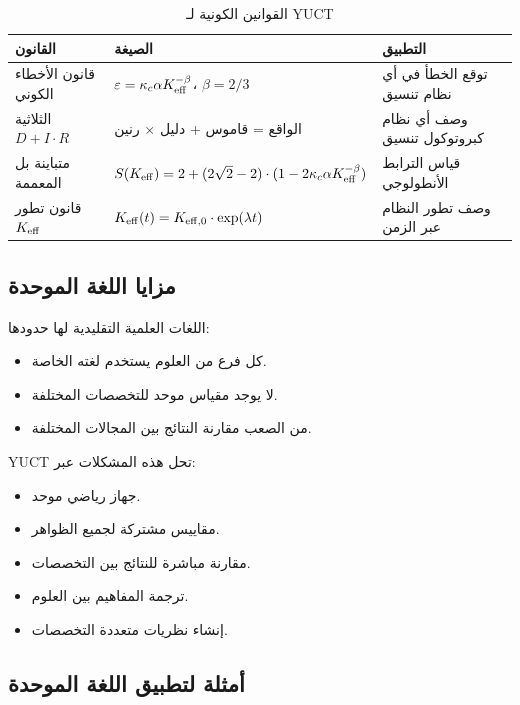 \documentclass[11pt,a4paper]{article}
\begin{document}
	\begin{table}[H]
		\centering
		\caption{القوانين الكونية لـ YUCT}
		\label{tab:universal-laws}
		\begin{tabular}{p{5cm}p{6cm}p{5cm}}
			\toprule
			\textbf{القانون} & \textbf{الصيغة} & \textbf{التطبيق} \\
			\midrule
			قانون الأخطاء الكوني & \(\varepsilon = \kappa_c \alpha \Keff^{-\beta}\)، \(\beta = 2/3\) & توقع الخطأ في أي نظام تنسيق \\
			الثلاثية \(D + I \cdot R\) & الواقع = قاموس + دليل × رنين & وصف أي نظام كبروتوكول تنسيق \\
			متباينة بل المعممة & \(S(\Keff) = 2 + (2\sqrt{2}-2)\cdot(1 - 2\kappa_c \alpha \Keff^{-\beta})\) & قياس الترابط الأنطولوجي \\
			قانون تطور \(\Keff\) & \(\Keff(t) = \Keff[0] \cdot \exp(\lambda t)\) & وصف تطور النظام عبر الزمن \\
			\bottomrule
		\end{tabular}
	\end{table}
	
	\subsection{مزايا اللغة الموحدة}
	
	اللغات العلمية التقليدية لها حدودها:
	\begin{itemize}
		\item كل فرع من العلوم يستخدم لغته الخاصة.
		\item لا يوجد مقياس موحد للتخصصات المختلفة.
		\item من الصعب مقارنة النتائج بين المجالات المختلفة.
	\end{itemize}
	
	YUCT تحل هذه المشكلات عبر:
	\begin{itemize}
		\item جهاز رياضي موحد.
		\item مقاييس مشتركة لجميع الظواهر.
		\item مقارنة مباشرة للنتائج بين التخصصات.
		\item ترجمة المفاهيم بين العلوم.
		\item إنشاء نظريات متعددة التخصصات.
	\end{itemize}
	
	\subsection{أمثلة لتطبيق اللغة الموحدة}
	
\end{document}
